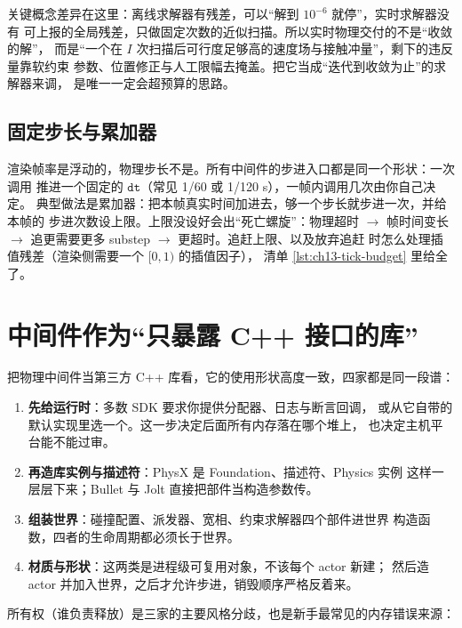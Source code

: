 \documentclass[12pt,a4paper,fontset=fandol]{ctexbook}
\newcommand{\Tp}[1]{\texttt{#1}}
\begin{document}
关键概念差异在这里：离线求解器有残差，可以``解到 $10^{-6}$ 就停''，实时求解器没有
可上报的全局残差，只做固定次数的近似扫描。所以实时物理交付的不是``收敛的解''，
而是``一个在 $I$ 次扫描后可行度足够高的速度场与接触冲量''，剩下的违反量靠软约束
参数、位置修正与人工限幅去掩盖。把它当成``迭代到收敛为止''的求解器来调，
是唯一一定会超预算的思路。

\subsection{固定步长与累加器}
\label{sec:ch13-fixed-step}

渲染帧率是浮动的，物理步长不是。所有中间件的步进入口都是同一个形状：一次调用
推进一个固定的 $\Tp{dt}$（常见 1/60 或 1/120 s），一帧内调用几次由你自己决定。
典型做法是累加器：把本帧真实时间加进去，够一个步长就步进一次，并给本帧的
步进次数设上限。上限没设好会出``死亡螺旋''：物理超时 $\rightarrow$ 帧时间变长
$\rightarrow$ 追更需要更多 substep $\rightarrow$ 更超时。追赶上限、以及放弃追赶
时怎么处理插值残差（渲染侧需要一个 $[0,1)$ 的插值因子），
清单 \ref{lst:ch13-tick-budget} 里给全了。

\section{中间件作为``只暴露 C++ 接口的库''}
\label{sec:ch13-middleware-shape}

把物理中间件当第三方 C++ 库看，它的使用形状高度一致，四家都是同一段谱：

\begin{enumerate}
  \item \textbf{先给运行时}：多数 SDK 要求你提供分配器、日志与断言回调，
        或从它自带的默认实现里选一个。这一步决定后面所有内存落在哪个堆上，
        也决定主机平台能不能过审。
  \item \textbf{再造库实例与描述符}：PhysX 是 Foundation、描述符、Physics 实例
        这样一层层下来；Bullet 与 Jolt 直接把部件当构造参数传。
  \item \textbf{组装世界}：碰撞配置、派发器、宽相、约束求解器四个部件进世界
        构造函数，四者的生命周期都必须长于世界。
  \item \textbf{材质与形状}：这两类是进程级可复用对象，不该每个 actor 新建；
        然后造 actor 并加入世界，之后才允许步进，销毁顺序严格反着来。
\end{enumerate}

所有权（谁负责释放）是三家的主要风格分歧，也是新手最常见的内存错误来源：
\end{document}
